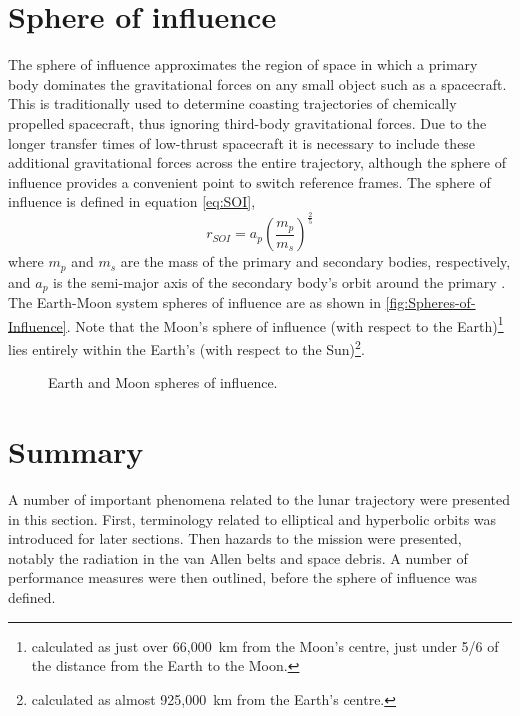 \section{Sphere of influence} \label{sec:SOI}
The sphere of influence approximates the region of space in which a primary body dominates the gravitational forces on any small object such as a spacecraft. This is traditionally used to determine coasting trajectories of chemically propelled spacecraft, thus ignoring third-body gravitational forces. Due to the longer transfer times of low-thrust spacecraft it is necessary to include these additional gravitational forces across the entire trajectory, although the sphere of influence provides a convenient point to switch reference frames. The sphere of influence is defined in equation \eqref{eq:SOI},
\begin{equation}
r_{SOI}=a_{p}\left(\frac{m_{p}}{m_{s}}\right)^{\frac{2}{5}} \label{eq:SOI}
\end{equation}
where $m_{p}$ and $m_{s}$ are the mass of the primary and secondary bodies, respectively, and $a_{p}$ is the semi-major axis of the secondary body's orbit around the primary \parencite{Kemble2006}. The Earth-Moon system spheres of influence are as shown in \autoref{fig:Spheres-of-Influence}.
 Note that the Moon's sphere of influence (with respect to the Earth)\footnote{calculated as just over 66,000~km from the Moon's centre, just under 5/6 of the distance from the Earth to the Moon.} lies entirely within the Earth's (with respect to the Sun)\footnote{calculated as almost 925,000~km from the Earth's centre.}.

\begin{figure} [h]
\caption{Earth and Moon spheres of influence.} \label{fig:Spheres-of-Influence}
\centering
\def\svgwidth{\figurewidth}

\end{figure}

\section{Summary} \label{sec:Rocket-science-summary}

A number of important phenomena related to the lunar trajectory were presented in this section. First, terminology related to elliptical and hyperbolic orbits was introduced for later sections. Then hazards to the mission were presented, notably the radiation in the van Allen belts and space debris. A number of performance measures were then outlined, before the sphere of influence was defined.
